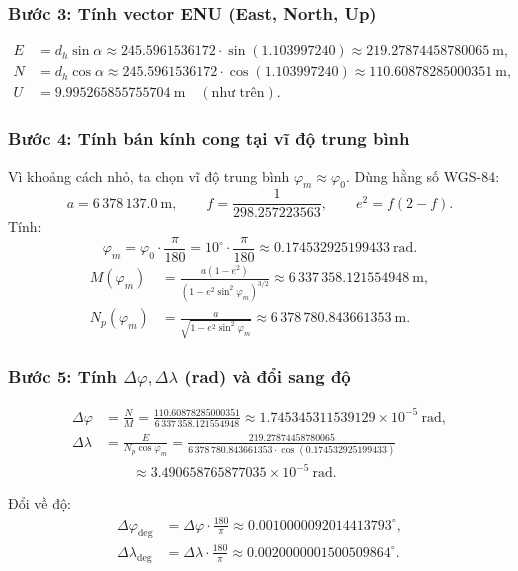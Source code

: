 \subsubsection*{Bước 3: Tính vector ENU (East, North, Up)}
\[
\begin{aligned}
E &= d_h \sin\alpha \approx 245.5961536172\cdot\sin(1.103997240) \approx 219.27874458780065\ \mathrm{m},\\[4pt]
N &= d_h \cos\alpha \approx 245.5961536172\cdot\cos(1.103997240) \approx 110.60878285000351\ \mathrm{m},\\[4pt]
U &= 9.995265855755704\ \mathrm{m}\quad(\text{như trên}).
\end{aligned}
\]

\subsubsection*{Bước 4: Tính bán kính cong tại vĩ độ trung bình}
Vì khoảng cách nhỏ, ta chọn vĩ độ trung bình \(\varphi_m \approx \varphi_0\). Dùng hằng số WGS-84:
\[
a = 6\,378\,137.0\ \mathrm{m},\qquad f = \frac{1}{298.257223563},\qquad e^2 = f(2-f).
\]
Tính:
\[
\varphi_m = \varphi_0\cdot\frac{\pi}{180} = 10^\circ\cdot\frac{\pi}{180} \approx 0.174532925199433\ \text{rad}.
\]
\[
\begin{aligned}
M(\varphi_m) &= \frac{a(1-e^2)}{(1 - e^2\sin^2\varphi_m)^{3/2}}
\approx 6\,337\,358.121554948\ \mathrm{m},\\[4pt]
N_p(\varphi_m) &= \frac{a}{\sqrt{1 - e^2\sin^2\varphi_m}}
\approx 6\,378\,780.843661353\ \mathrm{m}.
\end{aligned}
\]

\subsubsection*{Bước 5: Tính \(\Delta\varphi, \Delta\lambda\) (rad) và đổi sang độ}
\[
\begin{aligned}
\Delta\varphi &= \frac{N}{M} = \frac{110.60878285000351}{6\,337\,358.121554948}
\approx 1.745345311539129\times 10^{-5}\ \text{rad},\\[6pt]
\Delta\lambda &= \frac{E}{N_p\cos\varphi_m}
= \frac{219.27874458780065}{6\,378\,780.843661353\cdot\cos(0.174532925199433)}\\
&\qquad\approx 3.490658765877035\times 10^{-5}\ \text{rad}.
\end{aligned}
\]

Đổi về độ:
\[
\begin{aligned}
\Delta\varphi_{\text{deg}} &= \Delta\varphi\cdot\frac{180}{\pi}\approx 0.0010000092014413793^\circ,\\[4pt]
\Delta\lambda_{\text{deg}} &= \Delta\lambda\cdot\frac{180}{\pi}\approx 0.0020000001500509864^\circ.
\end{aligned}
\]


